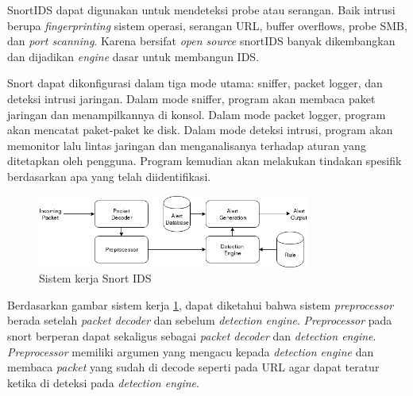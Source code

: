 \documentclass[./skripsi.tex]{subfiles}
\begin{document}
\par SnortIDS dapat digunakan untuk mendeteksi probe atau serangan. Baik intrusi berupa \textit{fingerprinting} sistem operasi,  serangan URL, buffer overflows, probe SMB, dan \textit{port scanning}. Karena bersifat \textit{open source} snortIDS banyak dikembangkan dan dijadikan \textit{engine} dasar untuk membangun IDS. \cite{stanger2011cheat}

\par Snort dapat dikonfigurasi dalam tiga mode utama: sniffer, packet logger, dan deteksi intrusi jaringan. Dalam mode sniffer, program akan membaca paket jaringan dan menampilkannya di konsol. Dalam mode packet logger, program akan mencatat paket-paket ke disk. Dalam mode deteksi intrusi, program akan memonitor lalu lintas jaringan dan menganalisanya terhadap aturan yang ditetapkan oleh pengguna. Program kemudian akan melakukan tindakan spesifik berdasarkan apa yang telah diidentifikasi.
\begin{figure}[H]
    \centering
    \includegraphics[width=0.8\textwidth]{public/assets/img/SnortIDS.png}
    \caption{Sistem kerja Snort IDS}
    \label{fig:sissnort}
\end{figure}
\par Berdasarkan gambar sistem kerja \ref{fig:sissnort}, dapat diketahui bahwa sistem \textit{preprocessor} berada setelah \textit{packet decoder} dan sebelum \textit{detection engine}. \textit{Preprocessor} pada snort berperan dapat sekaligus sebagai \textit{packet decoder} dan \textit{detection engine}. \textit{Preprocessor} memiliki argumen yang mengacu kepada \textit{detection engine} dan membaca \textit{packet} yang sudah di decode seperti pada URL agar dapat teratur ketika di deteksi pada \textit{detection engine}.
\end{document}
